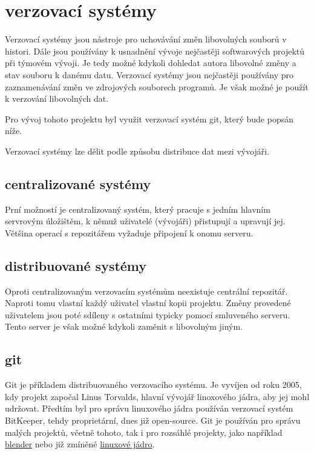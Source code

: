 \documentclass[main.tex]{subfiles}
\begin{document}
\section{verzovací systémy}
Verzovací systémy jsou nástroje pro uchovávání změn libovolných souborů v histori. Dále jsou používány k usnadnění vývoje nejčastěji softwarových projektů při týmovém vývoji. Je tedy možné kdykoli dohledat autora libovolné změny a stav souboru k danému datu. Verzovací systémy jsou nejčastěji používány pro zaznamenávání změn ve zdrojových souborech programů. Je však možné je použít k verzování libovolných dat.

Pro vývoj tohoto projektu byl využit verzovací systém git, který bude popsán níže.

Verzovací systémy lze dělit podle způsobu distribuce dat mezi vývojáři.

\subsection{centralizované systémy}
Prní možností je centralizovaný systém, který pracuje s jedním hlavním servrovým úložištěm, k němuž uživatelé (vývojáři) přistupují a upravují jej. Většina operací s repozitářem vyžaduje připojení k onomu serveru.

\subsection{distribuované systémy}
Oproti centralizovaným verzovacím systémům neexistuje centrální repozitář. Naproti tomu vlastní každý uživatel vlastní kopii projektu. Změny provedené uživatelem jsou poté sdíleny s ostatními typicky pomocí smluveného serveru. Tento server je však možné kdykoli zaměnit s libovolným jiným.

\subsection{git}
Git je příkladem distribuovaného verzovacího systému. Je vyvíjen od roku 2005, kdy projekt započal Linus Torvalds, hlavní vývojář linoxového jádra, aby jej mohl udržovat. Předtím byl pro správu linuxového jádra používán verzovací systém BitKeeper, tehdy proprietární, dnes již open-source. \cite{web:wik:git} Git je používán pro správu malých projektů, včetně tohoto, tak i pro rozsáhlé projekty, jako například \href{https://github.com/blender/blender}{blender} nebo již zmíněné \href{https://github.com/torvalds/linux}{linuxové jádro}.
\end{document}
